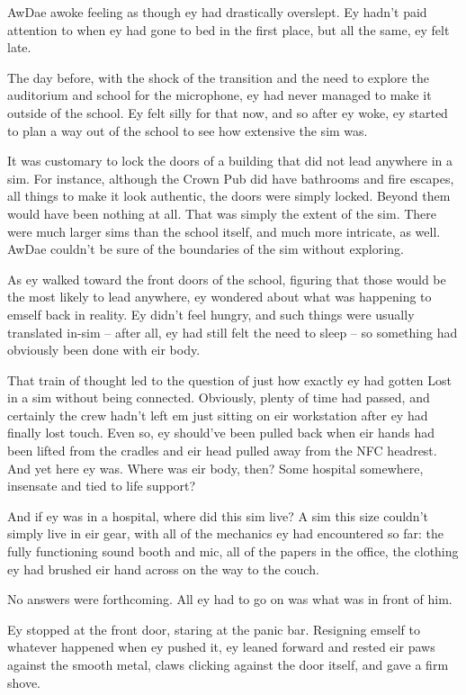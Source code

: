 AwDae awoke feeling as though ey had drastically overslept. Ey hadn't paid attention to when ey had gone to bed in the first place, but all the same, ey felt late.

The day before, with the shock of the transition and the need to explore the auditorium and school for the microphone, ey had never managed to make it outside of the school. Ey felt silly for that now, and so after ey woke, ey started to plan a way out of the school to see how extensive the sim was.

It was customary to lock the doors of a building that did not lead anywhere in a sim. For instance, although the Crown Pub did have bathrooms and fire escapes, all things to make it look authentic, the doors were simply locked. Beyond them would have been nothing at all. That was simply the extent of the sim. There were much larger sims than the school itself, and much more intricate, as well. AwDae couldn't be sure of the boundaries of the sim without exploring.

As ey walked toward the front doors of the school, figuring that those would be the most likely to lead anywhere, ey wondered about what was happening to emself back in reality. Ey didn't feel hungry, and such things were usually translated in-sim -- after all, ey had still felt the need to sleep -- so something had obviously been done with eir body.

That train of thought led to the question of just how exactly ey had gotten Lost in a sim without being connected. Obviously, plenty of time had passed, and certainly the crew hadn't left em just sitting on eir workstation after ey had finally lost touch. Even so, ey should've been pulled back when eir hands had been lifted from the cradles and eir head pulled away from the NFC headrest. And yet here ey was. Where was eir body, then? Some hospital somewhere, insensate and tied to life support?

And if ey was in a hospital, where did this sim live? A sim this size couldn't simply live in eir gear, with all of the mechanics ey had encountered so far: the fully functioning sound booth and mic, all of the papers in the office, the clothing ey had brushed eir hand across on the way to the couch.

No answers were forthcoming. All ey had to go on was what was in front of him.

Ey stopped at the front door, staring at the panic bar. Resigning emself to whatever happened when ey pushed it, ey leaned forward and rested eir paws against the smooth metal, claws clicking against the door itself, and gave a firm shove.

